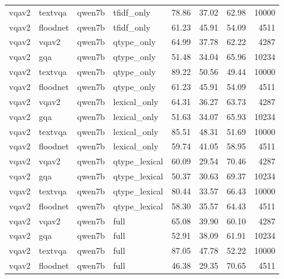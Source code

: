 \begin{tabular}{llllrrrr}
vqav2 & textvqa & qwen7b & tfidf_only & 78.86 & 37.02 & 62.98 & 10000 \\
vqav2 & floodnet & qwen7b & tfidf_only & 61.23 & 45.91 & 54.09 & 4511 \\
vqav2 & vqav2 & qwen7b & qtype_only & 64.99 & 37.78 & 62.22 & 4287 \\
vqav2 & gqa & qwen7b & qtype_only & 51.48 & 34.04 & 65.96 & 10234 \\
vqav2 & textvqa & qwen7b & qtype_only & 89.22 & 50.56 & 49.44 & 10000 \\
vqav2 & floodnet & qwen7b & qtype_only & 61.23 & 45.91 & 54.09 & 4511 \\
vqav2 & vqav2 & qwen7b & lexical_only & 64.31 & 36.27 & 63.73 & 4287 \\
vqav2 & gqa & qwen7b & lexical_only & 51.63 & 34.07 & 65.93 & 10234 \\
vqav2 & textvqa & qwen7b & lexical_only & 85.51 & 48.31 & 51.69 & 10000 \\
vqav2 & floodnet & qwen7b & lexical_only & 59.74 & 41.05 & 58.95 & 4511 \\
vqav2 & vqav2 & qwen7b & qtype_lexical & 60.09 & 29.54 & 70.46 & 4287 \\
vqav2 & gqa & qwen7b & qtype_lexical & 50.37 & 30.63 & 69.37 & 10234 \\
vqav2 & textvqa & qwen7b & qtype_lexical & 80.44 & 33.57 & 66.43 & 10000 \\
vqav2 & floodnet & qwen7b & qtype_lexical & 58.30 & 35.57 & 64.43 & 4511 \\
vqav2 & vqav2 & qwen7b & full & 65.08 & 39.90 & 60.10 & 4287 \\
vqav2 & gqa & qwen7b & full & 52.91 & 38.09 & 61.91 & 10234 \\
vqav2 & textvqa & qwen7b & full & 87.05 & 47.78 & 52.22 & 10000 \\
vqav2 & floodnet & qwen7b & full & 46.38 & 29.35 & 70.65 & 4511 \\
\bottomrule
\end{tabular}
